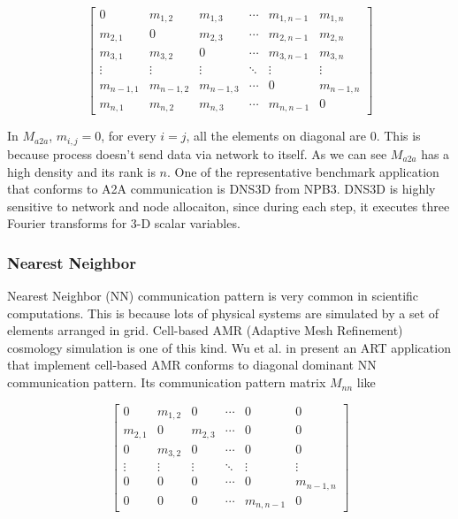 \documentclass[conference]{IEEEtran}
\begin{document}
\begin{displaymath}
\begin{bmatrix}
  0 & m_{1,2} & m_{1,3} & \cdots & m_{1,n-1} & m_{1,n}\\
  m_{2,1} & 0 & m_{2,3} &\cdots & m_{2,n-1}  & m_{2,n}\\
  m_{3,1} & m_{3,2} & 0 &\cdots & m_{3,n-1}  & m_{3,n}\\
  \vdots  & \vdots & \vdots & \ddots & \vdots & \vdots \\
  m_{n-1,1} & m_{n-1,2} & m_{n-1,3} & \cdots & 0 & m_{n-1,n}\\
  m_{n,1} & m_{n,2} & m_{n,3} & \cdots & m_{n,n-1} & 0
\end{bmatrix}
\end{displaymath}




In $M_{a2a}$, $m_{i,j} = 0$, for every $i=j$, all the elements on diagonal are 0. This is because process doesn't send data via network to itself. As we can see $M_{a2a}$ has a high density and its rank is $n$. One of the representative benchmark application that conforms to A2A communication is DNS3D from NPB3. DNS3D is highly sensitive to network and node allocaiton, since during each step, it executes three Fourier transforms for 3-D scalar variables\cite{zhou-ipdps}.
 
\subsubsection{Nearest Neighbor}
\label{sec:nearest neighbor}

Nearest Neighbor (NN) communication pattern is very common in scientific computations. This is because lots of physical systems are simulated by a set of elements arranged in grid. Cell-based AMR (Adaptive Mesh Refinement) cosmology simulation is one of this kind. Wu et al. in \cite{jingjin} present an ART application that implement cell-based AMR conforms to diagonal dominant NN communication pattern. Its communication pattern matrix $M_{nn}$ like 

\begin{displaymath}
 \begin{bmatrix}
  0 & m_{1,2} & 0 & \cdots & 0 & 0\\
  m_{2,1} & 0 & m_{2,3} &\cdots & 0  & 0\\
  0 & m_{3,2} & 0 &\cdots & 0  & 0\\
  \vdots  & \vdots & \vdots & \ddots & \vdots & \vdots \\
  0 & 0 & 0 & \cdots & 0 & m_{n-1, n}\\
  0 & 0 & 0 & \cdots & m_{n, n-1} & 0
 \end{bmatrix} 
\end{displaymath} 
\end{document}
